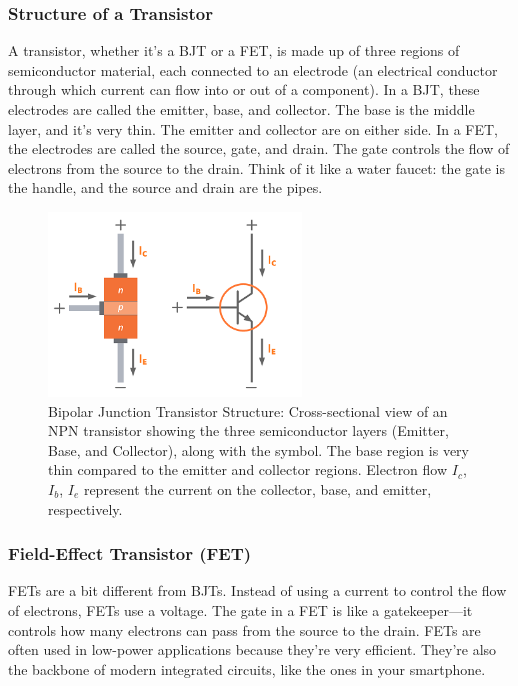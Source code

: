 \subsubsection*{Structure of a Transistor}
A transistor, whether it's a BJT or a FET, is made up of three regions of semiconductor material, each connected to an electrode (an electrical conductor through which current can flow into or out of a component). In a BJT, these electrodes are called the emitter, base, and collector. The base is the middle layer, and it's very thin. The emitter and collector are on either side. In a FET, the electrodes are called the source, gate, and drain. The gate controls the flow of electrons from the source to the drain. Think of it like a water faucet: the gate is the handle, and the source and drain are the pipes.

\begin{figure}[h!]
    \centering
    \includegraphics[width=0.6\textwidth]{tech/images/bjt-transistor.png}
    \caption{Bipolar Junction Transistor Structure: Cross-sectional view of an NPN transistor showing the three semiconductor layers (Emitter, Base, and Collector), along with the symbol. The base region is very thin compared to the emitter and collector regions. Electron flow  $I_c$, $I_b$, $I_e$ represent the current on the collector, base, and emitter, respectively. }
    \label{fig:bjt_structure}
\end{figure}

\subsubsection*{Field-Effect Transistor (FET)}
FETs are a bit different from BJTs. Instead of using a current to control the flow of electrons, FETs use a voltage. The gate in a FET is like a gatekeeper—it controls how many electrons can pass from the source to the drain. FETs are often used in low-power applications because they’re very efficient. They’re also the backbone of modern integrated circuits, like the ones in your smartphone.

